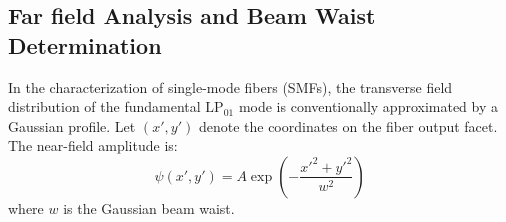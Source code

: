 






\subsection{Far field Analysis and Beam Waist Determination}

In the characterization of single-mode fibers (SMFs), the transverse field
distribution of the fundamental $\mathrm{LP}_{01}$ mode is conventionally
approximated by a Gaussian profile. Let $(x', y')$ denote the coordinates
on the fiber output facet. The near-field amplitude is:
\begin{equation}
\psi(x', y') = A \exp\left( -\frac{x'^2 + y'^2}{w^2} \right)
\end{equation}
where $w$ is the Gaussian beam waist.

